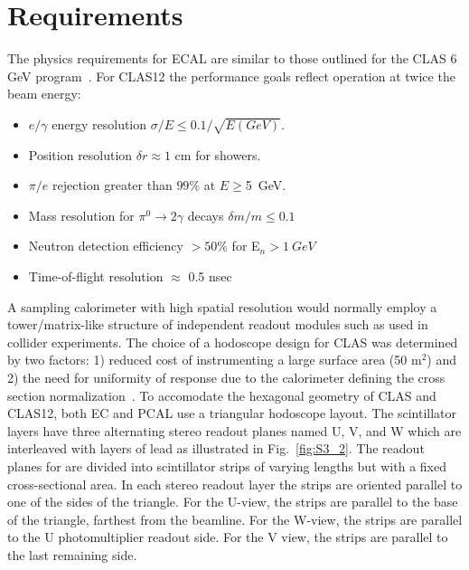 \section{Requirements}

The physics requirements for ECAL are similar to those outlined for the CLAS 6 GeV program~\cite{clas6nim}.  For CLAS12 the performance goals reflect operation at twice the beam energy:

\begin{itemize}
\item $e/\gamma$ energy resolution $\sigma/E \le 0.1/\sqrt{E(GeV)}$.  
\item Position resolution $\delta r\approx 1$ cm for showers.
\item $\pi/e$ rejection greater than $99\%$ at $E\ge$5~GeV.
\item Mass resolution for $\pi^0\rightarrow 2\gamma$ decays $\delta m/m \le 0.1$
\item Neutron detection efficiency $>50\%$ for E$_n>1~GeV$
\item Time-of-flight resolution $\approx$ 0.5 nsec
\end{itemize}

A sampling calorimeter with high spatial resolution would normally employ a tower/matrix-like structure of independent readout modules such as used in collider experiments.  The choice of a hodoscope design for CLAS was determined by two factors: 1) reduced cost of instrumenting a large surface area (50 m$^2$) and 2) the need for uniformity of response due to the calorimeter defining the cross section normalization~\cite{1990014}.  To accomodate the hexagonal geometry of CLAS and CLAS12, both EC and PCAL use a triangular hodoscope layout.  The scintillator layers have three alternating stereo readout planes named U, V, and W which are interleaved
with layers of lead as illustrated in Fig.~\ref{fig:S3_2}. The readout planes for are divided into scintillator strips
of varying lengths but with a fixed cross-sectional area. In each stereo readout layer
the strips are oriented parallel to one of the sides of the triangle. For the U-view, the
strips are parallel to the base of the triangle, farthest from the beamline. For the W-view, the strips are parallel
to the U photomultiplier readout side. For the V view, the strips are parallel to the last remaining side.  

